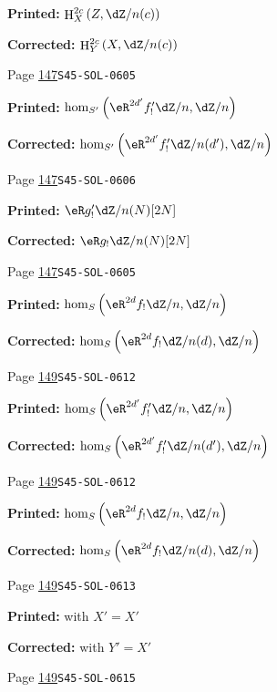 \documentclass[oneside]{book}
\DeclareMathOperator{\h}{H}
\theoremstyle{sga-source}
\theoremstyle{sga-source-dash}
\theoremstyle{sga-source-dotdash}
\theoremstyle{sga-source-number-note-dash}
\theoremstyle{sga-source-note-number-dotdash}
\theoremstyle{sga-source-example-dotdash}
\theoremstyle{sga-source-inline-number}
\theoremstyle{sga-source-bare-number}
\theoremstyle{sga-source}
\begin{document}
\begin{description}
\par\noindent\textbf{Printed:} \(\h_X^{2 c}\left(Z,\dZ/n(c)\right)\)
\par\noindent\textbf{Corrected:} \(\h_Y^{2 c}\left(X,\dZ/n(c)\right)\)
\smallskip
\item[\hypertarget{apparatus:EN-0077}{77}] Page \hyperlink{printpage:en:147}{147}\quad\texttt{S45-SOL-0605}
\par\noindent\textbf{Printed:} \(\hom_{S'}\left(\eR^{2 d'} f_!' \dZ/n,\dZ/n\right)\)
\par\noindent\textbf{Corrected:} \(\hom_{S'}\left(\eR^{2 d'} f_!' \dZ/n(d'),\dZ/n\right)\)
\smallskip
\item[\hypertarget{apparatus:EN-0078}{78}] Page \hyperlink{printpage:en:147}{147}\quad\texttt{S45-SOL-0606}
\par\noindent\textbf{Printed:} \(\eR g_!'\dZ/n(N)[2 N]\)
\par\noindent\textbf{Corrected:} \(\eR g_!\dZ/n(N)[2 N]\)
\smallskip
\item[\hypertarget{apparatus:EN-0079}{79}] Page \hyperlink{printpage:en:147}{147}\quad\texttt{S45-SOL-0605}
\par\noindent\textbf{Printed:} \(\hom_S\left(\eR^{2 d} f_!\dZ/n,\dZ/n\right)\)
\par\noindent\textbf{Corrected:} \(\hom_S\left(\eR^{2 d} f_!\dZ/n(d),\dZ/n\right)\)
\smallskip
\item[\hypertarget{apparatus:EN-0080}{80}] Page \hyperlink{printpage:en:149}{149}\quad\texttt{S45-SOL-0612}
\par\noindent\textbf{Printed:} \(\hom_S\left(\eR^{2 d'} f_!' \dZ/n,\dZ/n\right)\)
\par\noindent\textbf{Corrected:} \(\hom_S\left(\eR^{2 d'} f_!' \dZ/n(d'),\dZ/n\right)\)
\smallskip
\item[\hypertarget{apparatus:EN-0081}{81}] Page \hyperlink{printpage:en:149}{149}\quad\texttt{S45-SOL-0612}
\par\noindent\textbf{Printed:} \(\hom_S\left(\eR^{2 d}f_!\dZ/n,\dZ/n\right)\)
\par\noindent\textbf{Corrected:} \(\hom_S\left(\eR^{2 d}f_!\dZ/n(d),\dZ/n\right)\)
\smallskip
\item[\hypertarget{apparatus:EN-0082}{82}] Page \hyperlink{printpage:en:149}{149}\quad\texttt{S45-SOL-0613}
\par\noindent\textbf{Printed:} with $X'=X'$
\par\noindent\textbf{Corrected:} with $Y'=X'$
\smallskip
\item[\hypertarget{apparatus:EN-0083}{83}] Page \hyperlink{printpage:en:149}{149}\quad\texttt{S45-SOL-0615}

\end{description}
\end{document}
